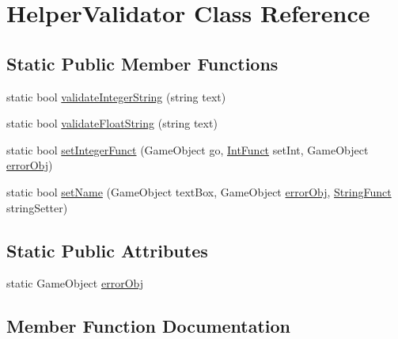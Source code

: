 \hypertarget{class_helper_validator}{}\section{Helper\+Validator Class Reference}
\label{class_helper_validator}
\subsection*{Static Public Member Functions}
\begin{DoxyCompactItemize}
\item 
static bool \mbox{\hyperlink{class_helper_validator_ae2a4197b74ecf12c37770790da74149f}{validate\+Integer\+String}} (string text)
\item 
static bool \mbox{\hyperlink{class_helper_validator_a655881eabb458927f86ff12201f68ba1}{validate\+Float\+String}} (string text)
\item 
static bool \mbox{\hyperlink{class_helper_validator_adabea3639000268b6d2a12a2b9c17eaf}{set\+Integer\+Funct}} (Game\+Object go, \mbox{\hyperlink{_helper_validator_8cs_a39d82d930145ffb7e5326699e0ef7f27}{Int\+Funct}} set\+Int, Game\+Object \mbox{\hyperlink{class_helper_validator_aa83d9143271cabe1e41f61d94304c960}{error\+Obj}})
\item 
static bool \mbox{\hyperlink{class_helper_validator_ac0d529df7419bf6aec6754c43565d4cc}{set\+Name}} (Game\+Object text\+Box, Game\+Object \mbox{\hyperlink{class_helper_validator_aa83d9143271cabe1e41f61d94304c960}{error\+Obj}}, \mbox{\hyperlink{_helper_validator_8cs_a960dfdb4c2811fe6c539a15632075939}{String\+Funct}} string\+Setter)
\end{DoxyCompactItemize}
\subsection*{Static Public Attributes}
\begin{DoxyCompactItemize}
\item 
static Game\+Object \mbox{\hyperlink{class_helper_validator_aa83d9143271cabe1e41f61d94304c960}{error\+Obj}}
\end{DoxyCompactItemize}


\subsection{Member Function Documentation}
\mbox{\label{class_helper_validator_adabea3639000268b6d2a12a2b9c17eaf}} 
